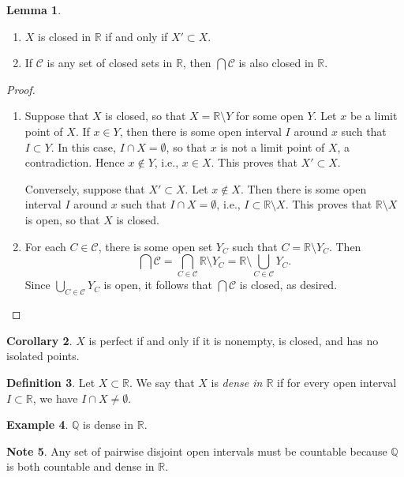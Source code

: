\documentclass[10pt,letterpaper,cm]{nupset}
\theoremstyle{definition}
\newtheorem{definition}{Definition}[subsection]
\newtheorem{exmp}[definition]{Example}
\newtheorem{note}[definition]{Note}
\theoremstyle{theorem}
\newtheorem{lemma}[definition]{Lemma}
\newtheorem{corollary}[definition]{Corollary}
\theoremstyle{remark}
\newcommand{\Q}{\mathbb Q}
\newcommand{\R}{\mathbb R}
\newcommand{\1}{\mathbf{1}}
\newcommand{\0}{\vec 0}
\begin{document}
\begin{lemma} $ $
\begin{enumerate}
\item $X$ is closed in $\R$ if and only if $X' \subset X$.
\item If $\mathcal{C}$ is any set of closed sets in $\R$, then $\bigcap \mathcal{C}$ is also closed in $\R$.
\end{enumerate}
\end{lemma}
\begin{proof} $ $
\begin{enumerate}
\item Suppose that $X$ is closed, so that $X = \R \setminus Y$ for some open $Y$. Let $x$ be a limit point of $X$.  If $x\in Y$, then there is some open interval $I$ around $x$ such that $I\subset Y$. In this case, $I\cap X = \emptyset$, so that $x$ is not a limit point of $X$, a contradiction. Hence $x\notin Y$, i.e., $x\in X$. This proves that $X' \subset X$. 

Conversely, suppose that $X' \subset X$. Let $x\notin X$. Then there is some open interval $I$ around $x$ such that $I\cap X =\emptyset$, i.e., $I \subset \R \setminus X$.  This proves that $ \R \setminus X$ is open, so that $X$ is closed.
\item For each $C\in \mathcal{C}$, there is some open set $Y_C$ such that $C = \R \setminus Y_C$. Then $$\bigcap \mathcal{C} = \bigcap_{C \in \mathcal{C}} \R \setminus Y_C = \R \setminus \bigcup_{C\in \mathcal{C}} Y_C.$$ Since  $\bigcup_{C\in \mathcal{C}} Y_C$ is open, it follows that $\bigcap \mathcal{C}$ is closed, as desired. 
\end{enumerate}
\end{proof}

\begin{corollary}
$X$ is perfect if and only if it is nonempty, is closed, and has no isolated points. 
\end{corollary}

\begin{definition}
Let  $X \subset \R$. We say that $X$ is \textit{dense in $\R$} if for every  open interval $I\subset \R$, we have $I \cap X \ne \emptyset$.
\end{definition}

\begin{exmp}
$\Q$ is dense in $\R$.
\end{exmp}

\begin{note}
Any set of pairwise disjoint open intervals must be countable because $\Q$ is both countable and dense in $\R$.
\end{note}
\end{document}

